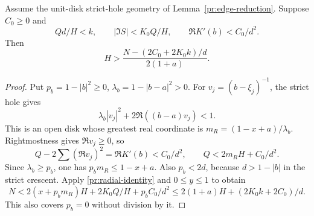 \begin{lemma}\label{lt:hole-field}
Assume the unit-disk strict-hole geometry of
Lemma~\ref{pr:edge-reduction}. Suppose $C_0\ge0$ and
\[
 Qd/H<k,\qquad |\Im S|<K_0Q/H,\qquad
 \Re K'(b)<C_0/d^2.
\]
Then
\begin{equation}\label{lt:general-hole-field}
 H>\frac{N-(2C_0+2K_0k)/d}{2(1+a)}.
\end{equation}
\end{lemma}
\begin{proof}
Put $p_b=1-|b|^2\ge0$, $\lambda_b=1-|b-a|^2>0$.
For $v_j=(b-\xi_j)^{-1}$, the strict hole gives
\[
 \lambda_b|v_j|^2+2\Re((b-a)v_j)<1.
\]
This is an open disk whose greatest real coordinate is
$m_R=(1-x+a)/\lambda_b$. Rightmostness gives $\Re v_j\ge0$,
so
\[
 Q-2\sum(\Re v_j)^2=\Re K'(b)<C_0/d^2,\qquad
 Q<2m_RH+C_0/d^2.
\]
Since $\lambda_b\ge p_b$, one has $p_bm_R\le1-x+a$.
Also $p_b<2d$, because $d>1-|b|$ in the strict crescent.
Apply \eqref{pr:radial-identity} and $0\le y\le1$ to obtain
\[
 N<2(x+p_bm_R)H+2K_0Q/H+p_bC_0/d^2
   \le2(1+a)H+(2K_0k+2C_0)/d.
\]
This also covers $p_b=0$ without division by it.
\end{proof}

